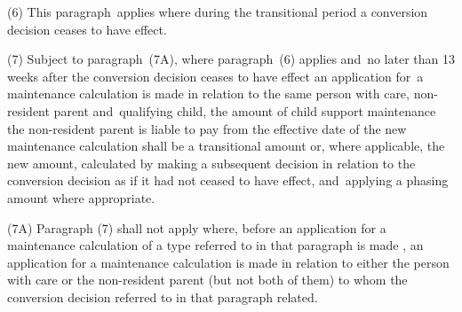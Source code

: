 \documentclass[12pt,a4paper]{article}
\begin{document}
(6) This paragraph~applies where during the transitional period a 
conversion decision  %
ceases to have effect.

(7) 
Subject to paragraph~(7A), where  %
paragraph~(6) applies and~no later than 13 weeks after the 
conversion decision  %
ceases to have effect 
an application for~a maintenance calculation  %
is made
in relation to the same person with care, non-resident parent and~qualifying child, the amount of child support maintenance the non-resident parent is liable to pay from the effective date of the new maintenance calculation shall be a transitional amount or, where applicable, the new amount, calculated by making a subsequent decision in relation to the 
conversion decision  %
as if it had not ceased to have effect, and~applying a phasing amount where appropriate.

(7A) Paragraph (7) shall not apply where, before an application for a maintenance calculation of a type referred to in that paragraph is made%
, an application for a maintenance calculation is made 
in relation to either the person with care or the non-resident parent (but not both of them) to whom the 
conversion decision  %
referred to in that paragraph related.
\end{document}
